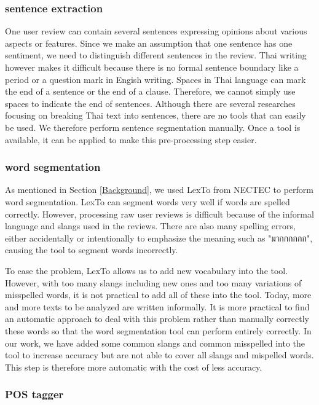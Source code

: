 \subsubsection{sentence extraction}
One user review can contain several sentences expressing opinions about various aspects or features. 
Since we make an assumption that one sentence has one sentiment, we need to distinguish different sentences in the review. Thai writing however makes it difficult because there is no formal sentence boundary like a period or a question mark in Engish writing. Spaces in Thai language can mark the end of a sentence or the end of a clause. Therefore, we cannot simply use spaces to indicate the end of sentences. Although there are several researches focusing on breaking Thai text into sentences, there are no tools that can easily be used. We therefore perform sentence segmentation manually. Once a tool is available, it can be applied to make this pre-processing step easier. 

\subsubsection{word segmentation}
As mentioned in Section \ref{Background}, we used LexTo\cite{LexTo} from NECTEC to perform word segmentation. LexTo can segment words very well if words are spelled correctly. However, processing raw user reviews is difficult because of the informal language and slangs used in the reviews. There are also many spelling errors, either accidentally or intentionally to emphasize the meaning such as "{มากกกกกก}", causing the tool to segment words incorrectly. 

To ease the problem, LexTo allows us to add new vocabulary into the tool. However, with too many slangs including new ones and too many variations of misspelled words, it is not practical to add all of these into the tool. Today, more and more texts to be analyzed are written informally. It is more practical to find an automatic approach to deal with this problem rather than manually correctly these words so that the word segmentation tool can perform entirely correctly. In our work, we have added some common slangs and common misspelled into the tool to increase accuracy but are not able to cover all slangs and mispelled words. This step is therefore more automatic with the cost of less accuracy.

\subsubsection{POS tagger}

